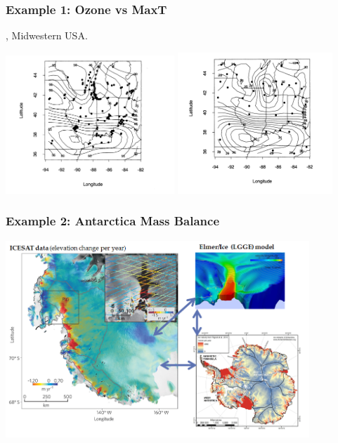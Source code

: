 \documentclass{beamer}
\begin{document}

\begin{frame}
\frametitle{Example 1: Ozone vs MaxT}

\cite{RoyleBerliner1999}, Midwestern USA.

\begin{center}
\includegraphics[width=2.5in]{./ozone.png}                                            
\includegraphics[width=2.3in]{./maxt.png}  
\end{center}
\end{frame}


\begin{frame}
\frametitle{Example 2: Antarctica Mass Balance}

\includegraphics[width=4.5in]{./Antarctica.png}        
\end{frame}
\end{document}
